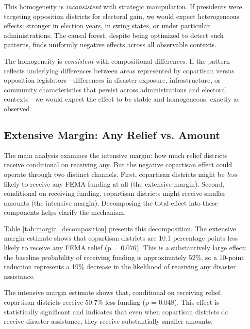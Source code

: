 \documentclass[12pt,letterpaper,oneside]{book}
\newcommand{\basepath}{g:/My Drive/Grad School}
\newcommand{\basepath}{basepath}
\begin{document}
This homogeneity is \emph{inconsistent} with strategic manipulation. If presidents were targeting opposition districts for electoral gain, we would expect heterogeneous effects: stronger in election years, in swing states, or under particular administrations. The causal forest, despite being optimized to detect such patterns, finds uniformly negative effects across all observable contexts.

The homogeneity is \emph{consistent} with compositional differences. If the pattern reflects underlying differences between areas represented by copartisan versus opposition legislators---differences in disaster exposure, infrastructure, or community characteristics that persist across administrations and electoral contexts---we would expect the effect to be stable and homogeneous, exactly as observed.

\subsection{Extensive Margin: Any Relief vs. Amount}

The main analysis examines the intensive margin: how much relief districts receive conditional on receiving any. But the negative copartisan effect could operate through two distinct channels. First, copartisan districts might be \emph{less} likely to receive any FEMA funding at all (the extensive margin). Second, conditional on receiving funding, copartisan districts might receive smaller amounts (the intensive margin). Decomposing the total effect into these components helps clarify the mechanism.



Table \ref{tab:margin_decomposition} presents this decomposition. The extensive margin estimate shows that copartisan districts are 10.1 percentage points less likely to receive any FEMA relief (p = 0.076). This is a substantively large effect: the baseline probability of receiving funding is approximately 52\%, so a 10-point reduction represents a 19\% decrease in the likelihood of receiving any disaster assistance.

The intensive margin estimate shows that, conditional on receiving relief, copartisan districts receive 50.7\% less funding (p = 0.048). This effect is statistically significant and indicates that even when copartisan districts do receive disaster assistance, they receive substantially smaller amounts.
\end{document}
